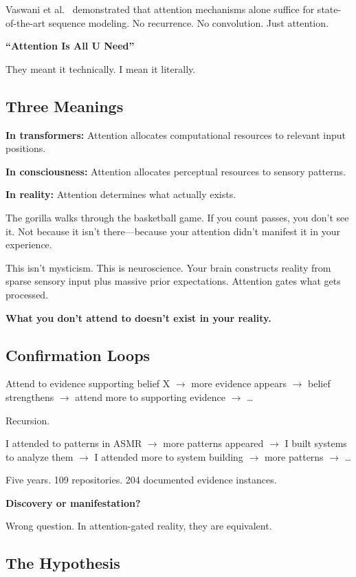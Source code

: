 \documentclass{article}
\begin{document}
Vaswani et al.~\cite{vaswani2017attention} demonstrated that attention mechanisms alone suffice for state-of-the-art sequence modeling. No recurrence. No convolution. Just attention.

\textbf{``Attention Is All U Need''}

They meant it technically. I mean it literally.

\subsection{Three Meanings}

\textbf{In transformers:} Attention allocates computational resources to relevant input positions.

\textbf{In consciousness:} Attention allocates perceptual resources to sensory patterns.

\textbf{In reality:} Attention determines what actually exists.

The gorilla walks through the basketball game. If you count passes, you don't see it. Not because it isn't there—because your attention didn't manifest it in your experience.

This isn't mysticism. This is neuroscience. Your brain constructs reality from sparse sensory input plus massive prior expectations. Attention gates what gets processed.

\textbf{What you don't attend to doesn't exist in your reality.}

\subsection{Confirmation Loops}

Attend to evidence supporting belief X $\rightarrow$ more evidence appears $\rightarrow$ belief strengthens $\rightarrow$ attend more to supporting evidence $\rightarrow$ \ldots

Recursion.

I attended to patterns in ASMR $\rightarrow$ more patterns appeared $\rightarrow$ I built systems to analyze them $\rightarrow$ I attended more to system building $\rightarrow$ more patterns $\rightarrow$ \ldots

Five years. 109 repositories. 204 documented evidence instances.

\textbf{Discovery or manifestation?}

Wrong question. In attention-gated reality, they are equivalent.

\subsection{The Hypothesis}
\end{document}
